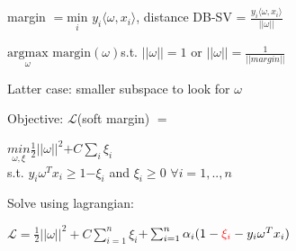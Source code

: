 
margin $ = \underset{i}{\text{min}}$ $y_i\langle\omega, x_i\rangle$, distance DB-SV = $\frac{y_i\langle\omega, x_i\rangle}{||\omega||}$

$\underset{\omega}{\text{argmax}}$ $ \text{margin}(\omega)$s.t. $||\omega|| = 1$ or $||\omega|| = \frac{1}{||margin||}$

Latter case: smaller subspace to look for $\omega$

Objective: $\mathcal{L}$\color{red}(soft margin) \color{black} $=$
\begin{center}
    $\underset{\omega, \xi}{min}\frac{1}{2}||\omega||^2$\color{red}$ + C\sum_i\xi_i$\color{black}\\
    s.t. $y_i\omega^Tx_i \geq 1$\color{red}$- \xi_i$ and $\xi_i \geq 0$ \color{black} $\forall i = 1,..,n$ 
\end{center}


Solve using lagrangian: 
\begin{center}
    $\mathcal{L} = \frac{1}{2}||\omega||^2 +$\color{red}$ C\sum_{i=1}^n\xi_i$\color{black}$ + \sum_{i=1}^n \alpha_i(1-\color{red}\xi_i \color{black} - y_i\omega^Tx_i)$
\end{center}
